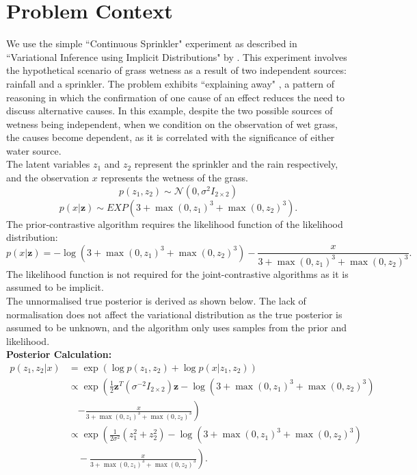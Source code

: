 \documentclass[honours,12pt]{unswthesis}
\numberwithin{equation}{section}
\theoremstyle{definition}
\begin{document}
\section{Problem Context}
We use the simple ``Continuous Sprinkler" experiment as described in ``Variational Inference using Implicit Distributions" by \citet{huszar}. This experiment involves the hypothetical scenario of grass wetness as a result of two independent sources: rainfall and a sprinkler. The problem exhibits ``explaining away" \citep{explain}, a pattern of reasoning in which the confirmation of one cause of an effect reduces the need to discuss alternative causes. In this example, despite the two possible sources of wetness being independent, when we condition on the observation of wet grass, the causes become dependent, as it is correlated with the significance of either water source.\\ 
The latent variables $z_1$ and $z_2$ represent the sprinkler and the rain respectively, and the observation $x$ represents the wetness of the grass.
\[p(z_1,z_2)\sim \mathcal{N} (0,\sigma^2 I_{2\times 2})\]
\[p(x|\bm{z})\sim EXP(3+\max(0,z_1)^3+\max(0,z_2)^3).\]
The prior-contrastive algorithm requires the likelihood function of the likelihood distribution:
\[p(x|\bm{z})=-\log (3+\max (0,z_1)^3+\max(0,z_2)^3)-\frac{x}{3+\max (0,z_1)^3+\max(0,z_2)^3}.\]
The likelihood function is not required for the joint-contrastive algorithms as it is assumed to be implicit.\\
The unnormalised true posterior is derived as shown below. The lack of normalisation does not affect the variational distribution as the true posterior is assumed to be unknown, and the algorithm only uses samples from the prior and likelihood.\\
\textbf{Posterior Calculation:}
\begin{equation}
\begin{aligned}
p(z_1,z_2|x)&= \exp(\log p(z_1,z_2)+\log p(x|z_1,z_2))\\
&\propto\exp\left(\frac12\bm{z}^T(\sigma^{-2}I_{2\times 2})\bm{z}-\log (3+\max(0,z_1)^3+\max(0,z_2)^3)\right.\\
&\quad\left.-\frac{x}{3+\max(0,z_1)^3+\max(0,z_2)^3}\right)\\
&\propto \exp\left(\frac{1}{2\sigma^2}(z_1^2+z_2^2)-\log (3+\max(0,z_1)^3+\max(0,z_2)^3)\right.\\
&\left.\quad-\frac{x}{3+\max(0,z_1)^3+\max(0,z_2)^3}\right).
\end{aligned}
\end{equation}
\end{document}
